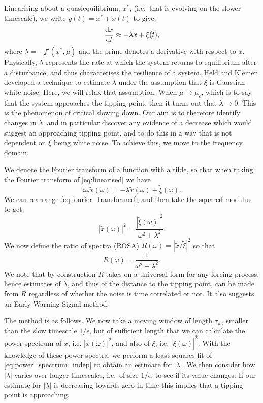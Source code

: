 Linearising about a quasiequilibrium, $x^*$, (i.e.\ that is evolving on the slower timescale), we write
$y(t) = x^* + x(t)$ to give:
\begin{equation}
  \label{eq:linearised}
  \dv{x}{t} \approx -\lambda x + \xi(t),
\end{equation}
where $\lambda = -f'(x^*,\mu)$ and the prime denotes a derivative with respect to $x$. 
Physically, $\lambda$ represents the rate at which the system returns to equilibrium after
a disturbance, and thus characterises the resilience of a system. Held and Kleinen\cite{Held2004} developed a technique to estimate $\lambda$
under the assumption that $\xi$ is Gaussian white noise. Here, we will
relax that assumption.
When $\mu \rightarrow \mu_c$, which is to say that the system approaches
the tipping point, then it turns out that $\lambda \rightarrow 0$\cite{guckenheimer2013}. This is the phenomenon of critical slowing down. Our aim is to therefore
identify changes in $\lambda$, and in particular discover any evidence of a decrease which would suggest an approaching tipping point, and
to do this in a way that is not dependent on $\xi$ being white noise. To achieve this, we move to the frequency domain.

We denote the Fourier transform of a function with a tilde, so that when taking the Fourier transform of \cref{eq:linearised} we have
\begin{equation}
  \label{eq:fourier_transformed}
  i\omega \tilde{x}(\omega) = -\lambda \tilde{x}(\omega) + \tilde{\xi}(\omega).
\end{equation}
We can rearrange \cref{eq:fourier_transformed}, and then take the squared modulus to get:
\begin{equation}
  \label{eq:power_spectra}
  |\tilde{x}(\omega)|^2 = \frac{|\tilde{\xi}(\omega)|^2}{\omega^2 + \lambda^2}.
\end{equation}
We now define the ratio of spectra (ROSA)
$R(\omega) = |\tilde{x}/\tilde{\xi}|^2$ so that
\begin{equation}
    \label{eq:power_spectrum_indep}
    R(\omega) = \frac{1}{\omega^2 + \lambda^2}.
\end{equation}
We note that by construction $R$ takes on a universal form for any 
forcing process,
hence estimates of $\lambda$, and thus of the 
distance to the tipping point, can be made from $R$ regardless 
of whether the noise is time correlated or not. It also suggests an
Early Warning Signal method.

The method is as follows.
We now take a moving window of length $\tau_w$, smaller than the slow timescale $1/\epsilon$, but of sufficient
length that we can calculate the power spectrum of $x$, i.e. $|\tilde{x}(\omega)|^2$, and also of
$\xi$, i.e. $|\tilde{\xi}(\omega)|^2$. With the knowledge of these power spectra, we perform a least-squares
fit of \cref{eq:power_spectrum_indep} to obtain an estimate for $|\lambda|$.  We then consider how $|\lambda|$ varies over longer timescales, i.e.\ of
size $1/\epsilon$, to see if its value changes. 
If our estimate for $|\lambda|$ is decreasing towards zero in time this implies that a tipping point is approaching. 

